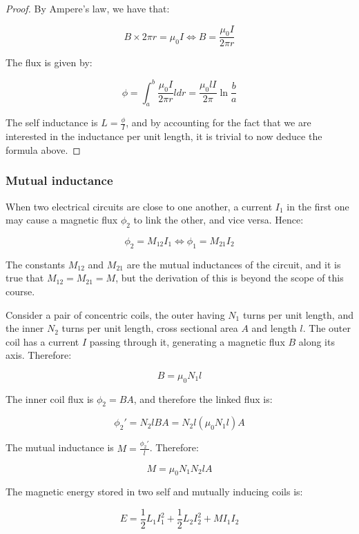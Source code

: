 \documentclass{article}
\begin{document}
\begin{proof}
    By Ampere's law, we have that:

    \[ B \times 2\pi r = \mu_0 I \iff B = \frac{\mu_0 I}{2\pi r} \]

    The flux is given by:

    \[ \phi = \int_a^b \frac{\mu_0 I}{2\pi r}ldr = \frac{\mu_0 lI}{2\pi}\ln{\frac{b}{a}} \]

    The self inductance is $L = \frac{\phi}{I}$, and by accounting for the fact that we are interested in the inductance per unit length, it is trivial to now deduce the formula above.
\end{proof}

\subsubsection{Mutual inductance}

When two electrical circuits are close to one another, a current $I_1$ in the first one may cause a magnetic flux $\phi_2$ to link the other, and vice versa. Hence:

\[ \phi_2 = M_{12}I_1 \iff \phi_1 = M_{21}I_2 \]

The constants $M_{12}$ and $M_{21}$ are the mutual inductances of the circuit, and it is true that $M_{12} = M_{21} = M$, but the derivation of this is beyond the scope of this course.

\begin{example}
    Consider a pair of concentric coils, the outer having $N_1$ turns per unit length, and the inner $N_2$ turns per unit length, cross sectional area $A$ and length $l$. The outer coil has a current $I$ passing through it, generating a magnetic flux $B$ along its axis. Therefore:

    \[ B = \mu_0N_1l \]

    The inner coil flux is $\phi_2 = BA$, and therefore the linked flux is:

    \[ \phi_2' = N_2lBA = N_2l(\mu_0N_1l)A \]

    The mutual inductance is $M = \frac{\phi_2'}{l}$. Therefore:

    \[ M = \mu_0N_1N_2lA \]
\end{example}

\begin{proposition}
    The magnetic energy stored in two self and mutually inducing coils is:

    \[ E = \frac{1}{2}L_1I_1^2 + \frac{1}{2}L_2I_2^2 + MI_1I_2 \]
\end{proposition}
\end{document}
